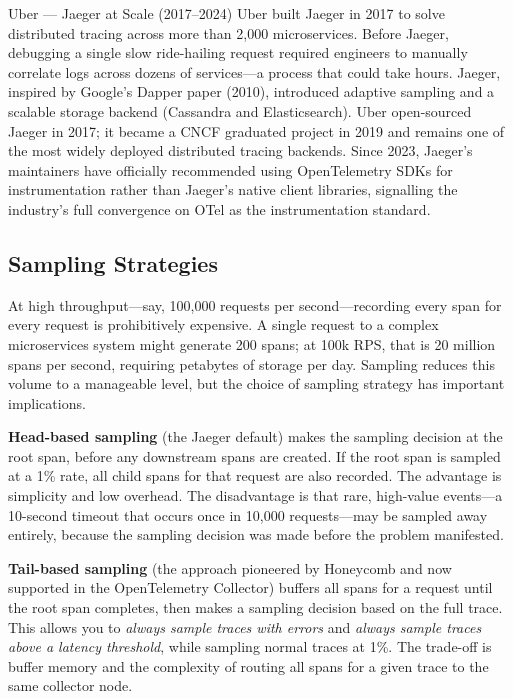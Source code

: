 \documentclass[11pt,a4paper]{article}
\begin{document}
\begin{industrybox}{Uber --- Jaeger at Scale (2017--2024)}
  Uber built Jaeger in 2017 to solve distributed tracing across more than 2,000 microservices. Before Jaeger, debugging a single slow ride-hailing request required engineers to manually correlate logs across dozens of services---a process that could take hours. Jaeger, inspired by Google's Dapper paper (2010), introduced adaptive sampling and a scalable storage backend (Cassandra and Elasticsearch). Uber open-sourced Jaeger in 2017; it became a CNCF graduated project in 2019 and remains one of the most widely deployed distributed tracing backends. Since 2023, Jaeger's maintainers have officially recommended using OpenTelemetry SDKs for instrumentation rather than Jaeger's native client libraries, signalling the industry's full convergence on OTel as the instrumentation standard.
\end{industrybox}

\subsection{Sampling Strategies}

At high throughput---say, 100,000 requests per second---recording every span for every request is prohibitively expensive. A single request to a complex microservices system might generate 200 spans; at 100k RPS, that is 20 million spans per second, requiring petabytes of storage per day. Sampling reduces this volume to a manageable level, but the choice of sampling strategy has important implications.

\textbf{Head-based sampling} (the Jaeger default) makes the sampling decision at the root span, before any downstream spans are created. If the root span is sampled at a 1\% rate, all child spans for that request are also recorded. The advantage is simplicity and low overhead. The disadvantage is that rare, high-value events---a 10-second timeout that occurs once in 10,000 requests---may be sampled away entirely, because the sampling decision was made before the problem manifested.

\textbf{Tail-based sampling} (the approach pioneered by Honeycomb and now supported in the OpenTelemetry Collector) buffers all spans for a request until the root span completes, then makes a sampling decision based on the full trace. This allows you to \emph{always sample traces with errors} and \emph{always sample traces above a latency threshold}, while sampling normal traces at 1\%. The trade-off is buffer memory and the complexity of routing all spans for a given trace to the same collector node.
\end{document}
